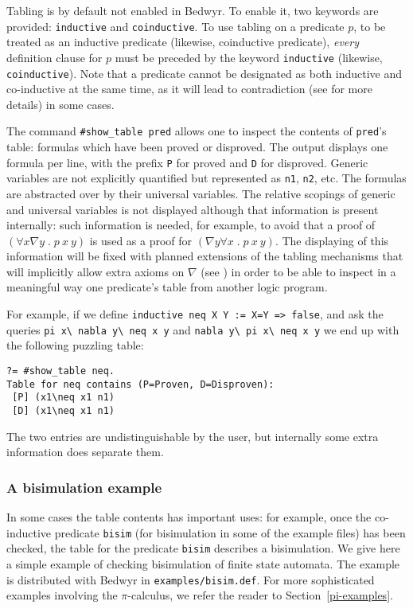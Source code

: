 \documentclass{article}
\newcommand{\qs}{\; . \;}
\begin{document}
Tabling is by default not enabled in Bedwyr. To enable it, two keywords
are provided: \texttt{inductive} and \texttt{coinductive}.
To use tabling on a predicate $p$, to be treated as an inductive predicate
(likewise, coinductive predicate), {\em every} definition clause for $p$
must be preceded by the keyword \texttt{inductive} 
(likewise, \texttt{coinductive}).
Note that a predicate cannot be designated as both inductive and co-inductive
at the same time, as it will lead to contradiction (see 
\cite{momigliano03types} for more details) in some cases. 

The command \verb/#show_table pred/ allows one to inspect the contents of
\verb.pred.'s table: formulas which have been proved or disproved.
The output displays one formula per line, with the prefix \verb.P. for proved 
and \verb.D. for disproved. Generic variables are not explicitly 
quantified but represented as \verb.n1., \verb.n2., etc. The formulas are 
abstracted over by their universal variables. The relative scopings
of generic and universal variables is not displayed 
although that information is present internally: such information is
needed, for example,
to avoid that a proof of $(\forall x\nabla y\qs p~x~y)$
is used as a proof for $(\nabla y\forall x\qs p~x~y)$.  The displaying
of this information will be 
fixed with planned extensions of the tabling mechanisms that will 
implicitly allow extra axioms on $\nabla$ (see \cite{tiu06lfmtp})
in order to be able to inspect in a meaningful way one predicate's
table from another logic program.

For example, if we define \verb.inductive neq X Y := X=Y => false.,
and ask the queries \verb.pi x\ nabla y\ neq x y.
and \verb.nabla y\ pi x\ neq x y. we end up with the following puzzling table:
\begin{verbatim}
?= #show_table neq.
Table for neq contains (P=Proven, D=Disproven):
 [P] (x1\neq x1 n1)
 [D] (x1\neq x1 n1)
\end{verbatim}
The two entries are undistinguishable by the user, but internally some
extra information does separate them.

\subsubsection{A bisimulation example}

In some cases the table contents has important uses: for
example, once the co-inductive predicate {\tt bisim} (for bisimulation
in some of the example files) has been checked, the table for the
predicate {\tt bisim} describes a bisimulation.  
We give here a simple example of checking bisimulation of finite
state automata.
The example is distributed with Bedwyr in \verb+examples/bisim.def+.
For more sophisticated examples involving the $\pi$-calculus,
we refer the reader to Section~\ref{pi-examples}.
\end{document}
